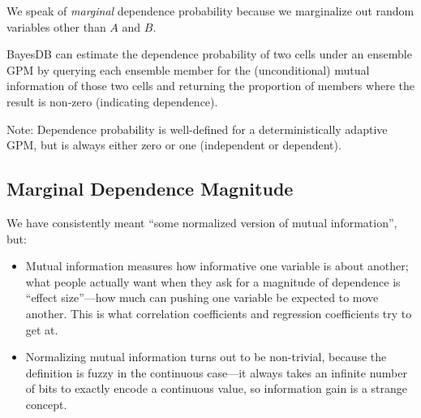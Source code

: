 \documentclass[10pt,letterpaper]{article}
\begin{document}
We speak of \emph{marginal} dependence probability because we
marginalize out random variables other than $A$ and $B$.

BayesDB can estimate the dependence probability of two cells under an
ensemble GPM by querying each ensemble member for the (unconditional)
mutual information of those two cells and returning the proportion of
members where the result is non-zero (indicating dependence).

Note: Dependence probability is well-defined for a deterministically
adaptive GPM, but is always either zero or one (independent or
dependent).





\subsection{Marginal Dependence Magnitude}


We have consistently meant ``some normalized version of mutual
information'', but:
\begin{itemize}
\item Mutual information measures how informative one variable is
  about another; what people actually want when they ask for a
  magnitude of dependence is ``effect size''---how much can pushing
  one variable be expected to move another.  This is what correlation
  coefficients and regression coefficients try to get at.
\item Normalizing mutual information turns out to be non-trivial,
  because the definition is fuzzy in the continuous case---it always
  takes an infinite number of bits to exactly encode a continuous
  value, so information gain is a strange concept.
\end{itemize}
\end{document}
